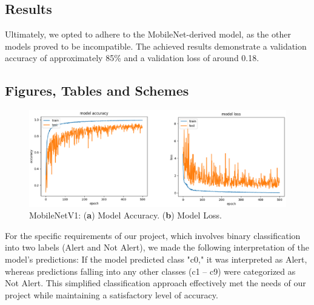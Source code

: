 \documentclass[journal,article,submit,pdftex,moreauthors]{Definitions/mdpi}
\begin{document}
\subsection{Results }
Ultimately, we opted to adhere to the MobileNet-derived model, as the other models proved to be incompatible. The achieved results demonstrate a validation accuracy of approximately 85\% and a validation loss of around 0.18.
\subsection{Figures, Tables and Schemes}
\begin{figure}[H]
\includegraphics[width=10.5 cm]{model.eps}
\caption{MobileNetV1: (\textbf{a}) Model Accuracy. (\textbf{b}) Model Loss.\label{fig1}}
\end{figure} 


For the specific requirements of our project, which involves binary classification into two labels (Alert and Not Alert), we made the following interpretation of the model's predictions: If the model predicted class "c0," it was interpreted as Alert, whereas predictions falling into any other classes (c1 – c9) were categorized as Not Alert. This simplified classification approach effectively met the needs of our project while maintaining a satisfactory level of accuracy.







%
\end{document}
